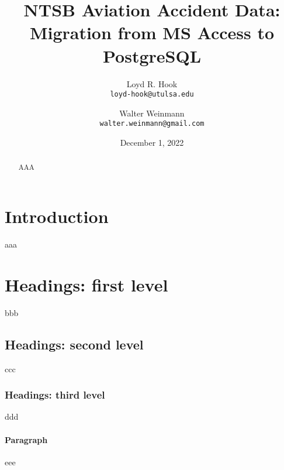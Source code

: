 \documentclass{article}
\title{NTSB Aviation Accident Data: Migration from MS Access to PostgreSQL }
\date{December 1, 2022}
\author{Loyd R. Hook\\
        \texttt{loyd-hook@utulsa.edu}
        \and 
        Walter Weinmann\\
        \texttt{walter.weinmann@gmail.com}}
\begin{document}
\maketitle

\begin{abstract}
	AAA\cite{avall}
\end{abstract}


\section{Introduction}
aaa

\section{Headings: first level}
bbb\cite{Pre2008}

\subsection{Headings: second level}
ccc

\subsubsection{Headings: third level}
ddd

\paragraph{Paragraph}
eee




\end{document}
